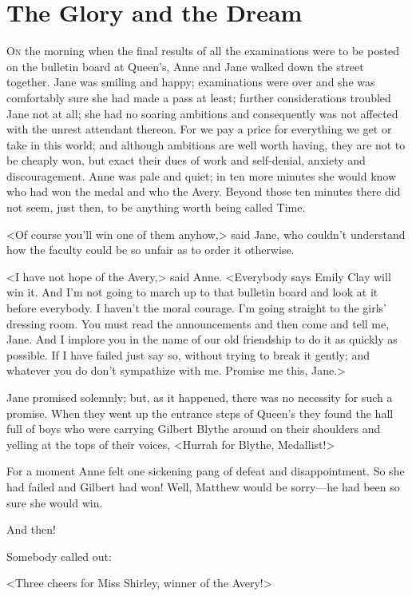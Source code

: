 \chapter{The Glory and the Dream}

\lettrine[]{O}{n} the morning when the final results of all the examinations were to be posted on the bulletin board at Queen's, Anne and Jane walked down the street together. Jane was smiling and happy; examinations were over and she was comfortably sure she had made a pass at least; further considerations troubled Jane not at all; she had no soaring ambitions and consequently was not affected with the unrest attendant thereon. For we pay a price for everything we get or take in this world; and although ambitions are well worth having, they are not to be cheaply won, but exact their dues of work and self-denial, anxiety and discouragement. Anne was pale and quiet; in ten more minutes she would know who had won the medal and who the Avery. Beyond those ten minutes there did not seem, just then, to be anything worth being called Time.

<Of course you'll win one of them anyhow,> said Jane, who couldn't understand how the faculty could be so unfair as to order it otherwise.

<I have not hope of the Avery,> said Anne. <Everybody says Emily Clay will win it. And I'm not going to march up to that bulletin board and look at it before everybody. I haven't the moral courage. I'm going straight to the girls' dressing room. You must read the announcements and then come and tell me, Jane. And I implore you in the name of our old friendship to do it as quickly as possible. If I have failed just say so, without trying to break it gently; and whatever you do don't sympathize with me. Promise me this, Jane.>

Jane promised solemnly; but, as it happened, there was no necessity for such a promise. When they went up the entrance steps of Queen's they found the hall full of boys who were carrying Gilbert Blythe around on their shoulders and yelling at the tops of their voices, <Hurrah for Blythe, Medallist!>

For a moment Anne felt one sickening pang of defeat and disappointment. So she had failed and Gilbert had won! Well, Matthew would be sorry—he had been so sure she would win.

And then!

Somebody called out:

<Three cheers for Miss Shirley, winner of the Avery!>

